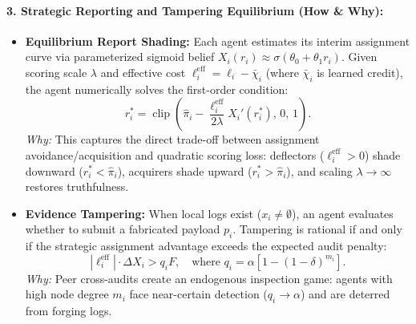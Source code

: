 \documentclass{article}
\theoremstyle{definition}
\begin{document}
\paragraph{3. Strategic Reporting and Tampering Equilibrium (How \& Why):}
\begin{itemize}
    \item \textbf{Equilibrium Report Shading:} Each agent estimates its interim assignment curve via parameterized sigmoid belief $X_i(r_i) \approx \sigma(\theta_0 + \theta_1 r_i)$. Given scoring scale $\lambda$ and effective cost $\ell_i^{\mathrm{eff}} = \ell_i - \bar{\chi}_i$ (where $\bar{\chi}_i$ is learned credit), the agent numerically solves the first-order condition:
    \begin{equation}
        r_i^* = \operatorname{clip}\left( \hat{\pi}_i - \frac{\ell_i^{\mathrm{eff}}}{2\lambda} X_i'(r_i^*), \, 0, \, 1 \right).
    \end{equation}
    \emph{Why:} This captures the direct trade-off between assignment avoidance/acquisition and quadratic scoring loss: deflectors ($\ell_i^{\mathrm{eff}} > 0$) shade downward ($r_i^* < \hat{\pi}_i$), acquirers shade upward ($r_i^* > \hat{\pi}_i$), and scaling $\lambda \to \infty$ restores truthfulness.
    \item \textbf{Evidence Tampering:} When local logs exist ($x_i \neq \emptyset$), an agent evaluates whether to submit a fabricated payload $p_i$. Tampering is rational if and only if the strategic assignment advantage exceeds the expected audit penalty:
    \begin{equation}
        |\ell_i^{\mathrm{eff}}| \cdot \Delta X_i > q_i F, \quad \text{where } q_i = \alpha \left[ 1 - (1 - \delta)^{m_i} \right].
    \end{equation}
    \emph{Why:} Peer cross-audits create an endogenous inspection game: agents with high node degree $m_i$ face near-certain detection ($q_i \to \alpha$) and are deterred from forging logs.
\end{itemize}
\end{document}
